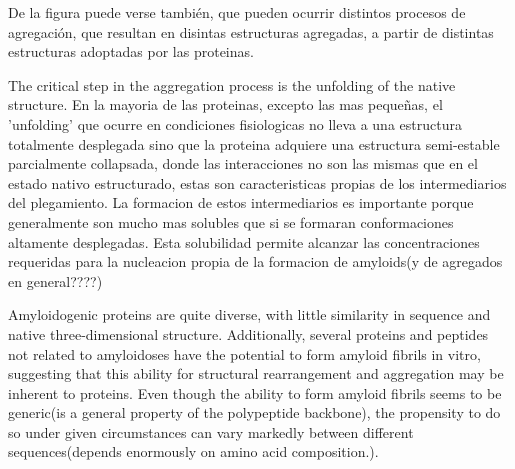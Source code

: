 De la figura puede verse también, que pueden ocurrir distintos procesos de agregación, que resultan en disintas estructuras agregadas, a partir de distintas estructuras adoptadas por las proteinas.

The critical step in the aggregation process is the unfolding of the native structure. 
En la mayoria de las proteinas, excepto las mas pequeñas, el 'unfolding' que ocurre en condiciones fisiologicas no lleva a una estructura totalmente desplegada sino que la proteina adquiere una estructura semi-estable parcialmente collapsada,
donde las interacciones no son las mismas que en el estado nativo estructurado, estas son caracteristicas propias de los intermediarios del plegamiento.
La formacion de estos intermediarios es importante porque generalmente son mucho mas solubles que si se formaran conformaciones altamente desplegadas. 
Esta solubilidad permite alcanzar las concentraciones requeridas para la nucleacion propia de la formacion de amyloids(y de agregados en general????)






Amyloidogenic proteins are quite diverse, with little similarity in sequence and native three-dimensional structure.
Additionally, several proteins and peptides not related to amyloidoses have the potential to form amyloid fibrils in vitro, suggesting that this ability for structural rearrangement and aggregation may be inherent to proteins.
Even though the ability to form amyloid fibrils seems to be generic(is a general property of the polypeptide backbone), the propensity to do so under given circumstances can vary markedly between different sequences(depends enormously on amino acid composition.).

